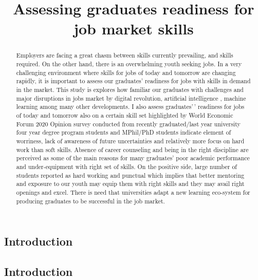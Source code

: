 \documentclass[
]{aft}
\title{Assessing graduates readiness for job market skills}
\author{}
\date{}
\begin{document}
\maketitle
\begin{abstract}
Employers are facing a great chasm between skills currently prevailing,
and skills required. On the other hand, there is an overwhelming youth
seeking jobs. In a very challenging environment where skills for jobs of
today and tomorrow are changing rapidly, it is important to assess our
graduates' readiness for jobs with skills in demand in the market. This
study is explores how familiar our graduates with challenges and major
disruptions in jobs market by digital revolution, artificial
intelligence , machine learning among many other developments. I also
assess graduates'\,' readiness for jobs of today and tomorrow also on a
certain skill set highlighted by World Economic Forum 2020 Opinion
survey conducted from recently graduated/last year university four year
degree program students and MPhil/PhD students indicate element of
worriness, lack of awareness of future uncertainties and relatively more
focus on hard work than soft skills. Absence of career counseling and
being in the right discipline are perceived as some of the main reasons
for many graduates' poor academic performance and under-equipment with
right set of skills. On the positive side, large number of students
reported as hard working and punctual which implies that better
mentoring and exposure to our youth may equip them with right skills and
they may avail right openings and excel. There is need that universities
adapt a new learning eco-system for producing graduates to be successful
in the job market.
\end{abstract}
\ifdefined\Shaded\renewenvironment{Shaded}{\begin{tcolorbox}[borderline west={3pt}{0pt}{shadecolor}, interior hidden, enhanced, boxrule=0pt, breakable, frame hidden, sharp corners]}{\end{tcolorbox}}\fi

\hypertarget{sec-intro}{%
\subsection{Introduction}\label{sec-intro}}

\hypertarget{introduction}{%
\subsection{Introduction}\label{introduction}}
\end{document}
